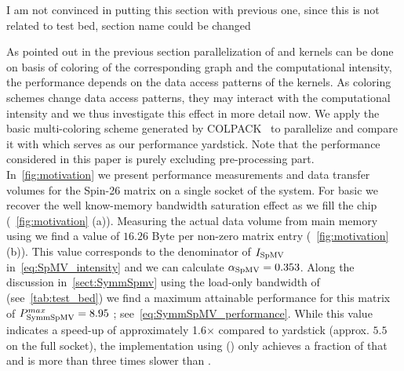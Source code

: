 {\CA I am not convinced in putting this section with previous one, since this is not related to test bed, section name could be changed}

As pointed out in the previous section parallelization of \SymmSpmv and \SYMMKACZ kernels can be done on basis of \DTWO coloring of the corresponding graph and the computational intensity, \ie the performance depends on the data access patterns of the kernels. As coloring schemes change data access patterns, they may interact with the computational intensity and we thus investigate this effect in more detail now. We apply  the basic multi-coloring scheme generated by COLPACK~\cite{COLPACK} to parallelize \SymmSpmv and compare it with \SpMV which serves as our performance yardstick. Note that the performance considered in this paper is purely excluding pre-processing part. In~\cref{fig:motivation} we present performance measurements and data transfer volumes for the Spin-26 matrix on a single socket of the \IVB system. For basic \SpMV we recover the well know-memory bandwidth saturation effect as we fill the chip (~\cref{fig:motivation} (a)). Measuring the actual data volume from main memory using \LIKWID we find a value of $16.26$ Byte per non-zero matrix entry (~\cref{fig:motivation} (b)). This value corresponds to the denominator of $I_\mathrm{SpMV}$ in~\cref{eq:SpMV_intensity} and we can calculate $\alpha_\mathrm{SpMV}=0.353$. Along the discussion in~\cref{sect:SymmSpmv} using the load-only bandwidth of \IVB (see~\cref{tab:test_bed}) we find a maximum attainable {\SymmSpmv} performance for this matrix of $P^{max}_\mathrm{SymmSpMV}=8.95$ \GF; see~\cref{eq:SymmSpMV_performance}. While this value indicates a speed-up of approximately 1.6$\times$ compared to \SpMV yardstick (approx. $5.5$ \GF on the full socket), the \SymmSpmv implementation using \MCfull (\MC) only achieves a fraction of that and is more than three times slower than \SpMV. 



